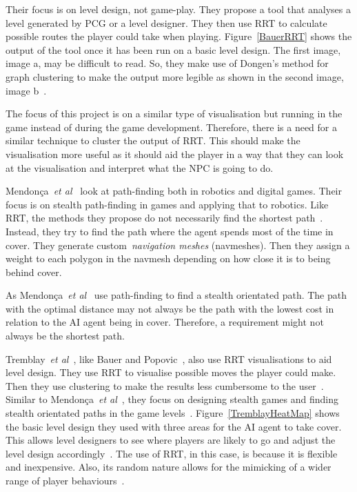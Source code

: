 \documentclass[journal]{IEEEtran}
\begin{document}
	Their focus is on level design, not game-play. They propose a tool that analyses a level generated by PCG or a level designer. They then use RRT to calculate possible routes the player could take when playing.  Figure~\ref{BauerRRT} shows the output of the tool once it has been run on a basic level design.  The first image, image a, may be difficult to read. So, they make use of Dongen's method for graph clustering to make the output more legible as shown in the second image, image b~\cite{bauer2012, Dongen2001}.  
	
	The focus of this project is on a similar type of visualisation but running in the game instead of during the game development. Therefore, there is a need for a similar technique to cluster the output of RRT. This should make the visualisation more useful as it should aid the player in a way that they can look at the visualisation and interpret what the NPC is going to do. 
	
	Mendonça~\textit{et al}~\cite{Mendonça2015} look at path-finding both in robotics and digital games. Their focus is on stealth path-finding in games and applying that to robotics. Like RRT, the methods they propose do not necessarily find the shortest path~\cite{karaman2010, Mendonça2015}. Instead, they try to find the path where the agent spends most of the time in cover. They generate custom~\textit{navigation meshes} (navmeshes). Then they assign a weight to each polygon in the navmesh depending on how close it is to being behind cover. 
	
	As Mendonça~\textit{et al}~\cite{Mendonça2015} use path-finding to find a stealth orientated path. The path with the optimal distance may not always be the path with the lowest cost in relation to the AI agent being in cover. Therefore, a requirement might not always be the shortest path. 
	
	Tremblay~\textit{et al}~\cite{Tremblay2013}, like Bauer and Popovic~\cite{bauer2012}, also use RRT visualisations to aid level design. They use RRT to visualise possible moves the player could make. Then they use clustering to make the results less cumbersome to the user~\cite{Tremblay2013}. Similar to Mendonça~\textit{et al}~\cite{Mendonça2015}, they focus on designing stealth games and finding stealth orientated paths in the game levels~\cite{Tremblay2013}.   Figure~\ref{TremblayHeatMap} shows the basic level design they used with three areas for the AI agent to take cover. This allows level designers to see where players are likely to go and adjust the level design accordingly~\cite{Tremblay2013}.  The use of RRT, in this case, is because it is flexible and inexpensive. Also, its random nature allows for the mimicking of a wider range of player behaviours~\cite{Tremblay2013}. 
	
\end{document}
